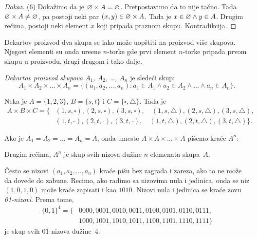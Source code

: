 \begin{proof}[Dokaz]
  \medskip

  (6)
  Doka\v zimo da je $\varnothing \times A = \varnothing$. Pretpostavimo da to nije ta\v cno. Tada $\varnothing \times A \ne \varnothing$, pa postoji neki
  par $(x, y) \in \varnothing \times A$. Tada je $x \in \varnothing \land y \in A$. Drugim re\v cima, postoji neki element $x$ koji pripada
  praznom skupu. Kontradikcija.
\end{proof}

Dekartov proizvod dva skupa se lako mo\v ze uop\v stiti na proizvod vi\v se skupova. Njegovi elementi su onda ure\dj ene
$n$-torke gde prvi element $n$-torke pripada prvom skupu u proizvodu, drugi drugom i tako dalje.

\begin{DEF}
  \emph{Dekartov proizvod skupova $A_1$, $A_2$, \ldots, $A_n$} je slede\'ci skup:
  $$
    A_1 \times A_2 \times \ldots \times A_n = \{(a_1, a_2, \ldots, a_n) : a_1 \in A_1 \land a_2 \in A_2 \land \ldots \land a_n \in A_n \}.
  $$
\end{DEF}

\begin{EX}\label{ft06.ex.3x2x2}
  Neka je $A = \{1, 2, 3\}$, $B = \{s, t\}$ i $C = \{\square, \triangle\}$. Tada je
  \begin{align*}
  A \times B \times C = \{ &(1,s,\square), (2,s,\square), (3,s,\square), \quad(1,s,\triangle), (2,s,\triangle), (3,s,\triangle), \\
                           &(1,t,\square), (2,t,\square), (3,t,\square), \quad(1,t,\triangle), (2,t,\triangle), (3,t,\triangle)\}.
  \end{align*}
\end{EX}

\noindent
Ako je $A_1 = A_2 = \ldots = A_n = A$, onda umesto $A \times A \times \ldots \times A$ pi\v semo kra\'ce $A^n$:
\begin{center}
\end{center}
Drugim re\v cima, $A^n$ je skup svih nizova du\v zine $n$ elemenata skupa~$A$.

\begin{EX}
  \v Cesto se nizovi $(a_1, a_2, \ldots, a_n)$ kra\'ce pi\v su bez zagrada i zareza, ako to ne mo\v ze da dovede do zabune.
  Recimo, ako radimo sa nizovima nula i jedinica, onda se niz $(1, 0, 1, 0)$ mo\v ze kra\'ce zapisati i kao $1010$.
  Nizovi nula i jedinica se kra\'ce zovu \emph{01-nizovi}. Prema tome,
  \begin{align*}
    \{0, 1\}^4 = \{ &0000, 0001, 0010, 0011, 0100, 0101, 0110, 0111,\\
                    &1000, 1001, 1010, 1011, 1100, 1101, 1110, 1111 \}
  \end{align*}
  je skup svih 01-nizova du\v zine~4.  
\end{EX}

